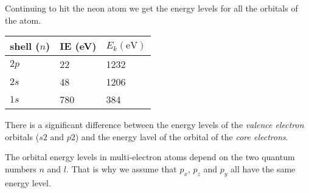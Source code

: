 \documentclass[../mit-general-chemistry.tex]{subfiles}
\begin{document}
Continuing to hit the neon atom we get the energy levels for all the
orbitals of the atom.

\begin{center}
  \begin{tabular}{lll}
    \toprule
    shell ($n$)& IE (\si{\eV})& $E_k (\si{\eV})$ \\
    \midrule
    $2p$ & 22 & 1232 \\
    $2s$ & 48 & 1206 \\
    $1s$ & 780 & 384 \\
    \bottomrule
  \end{tabular}
\end{center}
\begin{marginfigure}
  \begin{center}
  \end{center}
\end{marginfigure}


There is a significant difference between the energy levels of the
{\em valence electron} orbitals ($s2$ and $p2$) and the energy lavel
of the orbital of the {\em core electrons}.

The orbital energy levels in multi-electron atoms depend on the two
quantum numbers $n$ and $l$. That is why we assume that $p_x$, $p_z$
and $p_y$ all have the same energy level.
\end{document}
